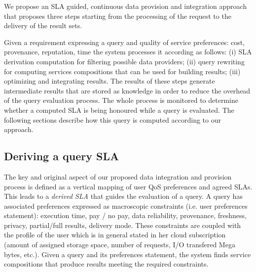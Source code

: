 We propose an SLA guided, continuous data provision and integration approach that proposes three steps  starting from the processing of the request  to the delivery of the result sets.

Given a requirement expressing a query and quality of service preferences: cost, provenance, reputation, time the system processes it according as follows: (i) SLA derivation computation for filtering possible data providers; (ii) query rewriting for computing services compositions that can be used for building results; (iii) optimizing and integrating results. The results of these steps generate intermediate results that are stored as knowledge in order to reduce the overhead of the query evaluation process. The whole process is monitored to determine whether a computed SLA is being honoured while a query is evaluated. 
The following sections describe how this query is computed according to our approach. 





\subsection{Deriving a query SLA}
\label{sec:slaModel}

%

The key and original aspect of   our proposed data integration and provision process is  defined as a vertical mapping of user QoS preferences and agreed SLAs. This  leads to a {\em derived SLA} that guides the evaluation of a query. A query has associated preferences  expressed as macroscopic constraints (i.e. user preferences statement): execution time, pay / no pay, data reliability, provenance, freshness, privacy, partial/full results, delivery mode. These constraints are coupled with the profile of the user which is in general stated in her cloud subscription (amount of assigned storage space, number of requests, I/O transfered Mega bytes, etc.). Given a query and its preferences statement, the system  finds  service compositions that produce results   meeting the required constraints. 

